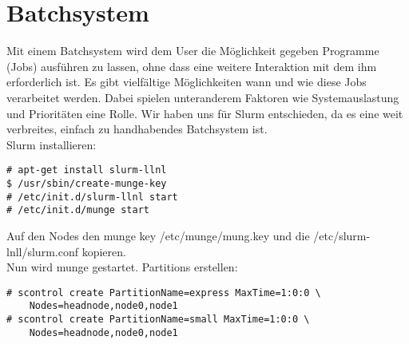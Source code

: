 \chapter{Batchsystem}
Mit einem Batchsystem wird dem User die Möglichkeit gegeben Programme (Jobs)
ausführen zu lassen, ohne dass eine weitere Interaktion mit dem ihm erforderlich
ist.
Es gibt vielfältige Möglichkeiten wann und wie diese Jobs 
verarbeitet werden. Dabei spielen unteranderem Faktoren wie Systemauslastung und
Prioritäten eine Rolle.
Wir haben uns für Slurm entschieden, da es eine weit verbreites,
einfach zu handhabendes Batchsystem ist.\\
Slurm installieren:
\begin{lstlisting}[style=Bash]
# apt-get install slurm-llnl
$ /usr/sbin/create-munge-key
# /etc/init.d/slurm-llnl start
# /etc/init.d/munge start
\end{lstlisting}
Auf den Nodes den munge key /etc/munge/mung.key und die /etc/slurm-lnll/slurm.conf kopieren.\\
Nun wird munge gestartet.
Partitions erstellen:
\begin{lstlisting}[style=Bash]
# scontrol create PartitionName=express MaxTime=1:0:0 \
	Nodes=headnode,node0,node1
# scontrol create PartitionName=small MaxTime=1:0:0 \
	Nodes=headnode,node0,node1
\end{lstlisting}

